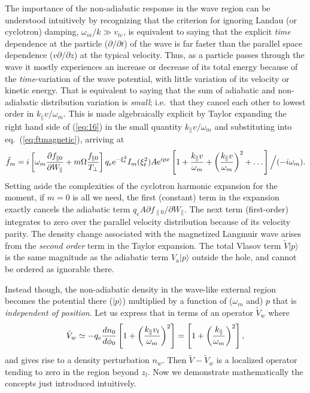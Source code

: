 \documentclass[12pt]{article}
\def\ket#1{|#1\rangle}
\begin{document}
The importance of the non-adiabatic response in the wave region can be
understood intuitively by recognizing that the criterion for ignoring
Landau (or cyclotron) damping, $\omega_m/k\gg v_{te}$, is equivalent
to saying that the explicit \emph{time} dependence at the particle
($\partial/\partial t$) of the wave is far faster than the parallel
space dependence ($v\partial/\partial z$) at the typical
velocity. Thus, as a particle passes through the wave it mostly
experiences an increase or decrease of its total energy because of the
\emph{time}-variation of the wave potential, with little variation of
its velocity or kinetic energy. That is equivalent to saying that the
sum of adiabatic and non-adiabatic distribution variation is
\emph{small}; i.e.\ that they cancel each other to lowest order in
$k_\parallel v/\omega_m$. This is made algebraically explicit by
Taylor expanding the right hand side of (\ref{eq:16}) in the small
quantity $k_\parallel v/\omega_m$ and substituting into eq.\
(\ref{eq:ftmagnetic}), arriving at
\begin{equation}
  \label{eq:17}
  \tilde f_m = i\left[\omega_m
    {\partial f_{\parallel0}\over \partial W_\parallel}
    +m\Omega {f_{\parallel0}\over T_\perp}\right]
  q_e{\rm e}^{-\xi_t^2}I_m(\xi_t^2) A{\rm e}^{ipx}
  \left[1+{k_\parallel v\over\omega_m}+
    \left({k_\parallel v\over\omega_m}\right)^2+\dots\right]
  \Big/(-i\omega_m).
\end{equation}
Setting aside the complexities of the cyclotron harmonic expansion
for the moment, if $m=0$ is all we need, the first (constant) term in
the expansion exactly cancels the adiabatic term
$q_eA{\partial f_{\parallel0}/\partial W_\parallel}$. The next
term (first-order) integrates to zero over the parallel velocity
distribution because of its velocity parity. The density change
associated with the magnetized Langmuir wave arises from the
\emph{second order} term in the Taylor expansion. The total Vlasov term
$\tilde{V}\ket{p}$ is the same magnitude as the adiabatic term $V_a\ket{p}$
outside the hole, and cannot be ordered as ignorable there.

Instead though, the non-adiabatic density in the wave-like external region
becomes the potential there ($\ket{p}$) multiplied by a function of
($\omega_m$ and) $p$ that is \emph{independent of position}. Let us
express that in terms of an operator $\tilde{V}_{w}$ where
\begin{equation}
  \label{eq:20}
\tilde{V}_{w}\simeq-q_e{dn_0\over d\phi_0}\left[1+\left(k_\parallel v_t\over\omega_m\right)^2\right]=\left[1+\left(k_\parallel\over\omega_m\right)^2\right],
\end{equation}
and gives rise to a density perturbation $n_w$.
 Then
$\tilde{V}-\tilde{V}_{w}$ is a localized operator tending to zero in
the region beyond $z_l$. Now we demonstrate mathematically the concepts
just introduced intuitively.
\end{document}
